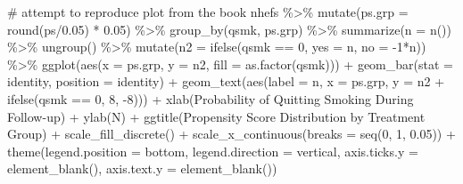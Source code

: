 \documentclass[
  10pt,
  a4paper,
]{book}
\newenvironment{Shaded}{\begin{snugshade}}{\end{snugshade}}
\newcommand{\AttributeTok}[1]{\textcolor[rgb]{0.40,0.45,0.13}{#1}}
\newcommand{\CommentTok}[1]{\textcolor[rgb]{0.37,0.37,0.37}{#1}}
\newcommand{\DecValTok}[1]{\textcolor[rgb]{0.68,0.00,0.00}{#1}}
\newcommand{\FloatTok}[1]{\textcolor[rgb]{0.68,0.00,0.00}{#1}}
\newcommand{\FunctionTok}[1]{\textcolor[rgb]{0.28,0.35,0.67}{#1}}
\newcommand{\NormalTok}[1]{\textcolor[rgb]{0.00,0.46,0.62}{#1}}
\newcommand{\SpecialCharTok}[1]{\textcolor[rgb]{0.37,0.37,0.37}{#1}}
\newcommand{\StringTok}[1]{\textcolor[rgb]{0.13,0.47,0.30}{#1}}
\begin{document}
\begin{Shaded}
\begin{Highlighting}[]
\CommentTok{\# attempt to reproduce plot from the book}
\NormalTok{nhefs }\SpecialCharTok{\%\textgreater{}\%}
  \FunctionTok{mutate}\NormalTok{(}\AttributeTok{ps.grp =} \FunctionTok{round}\NormalTok{(ps}\SpecialCharTok{/}\FloatTok{0.05}\NormalTok{) }\SpecialCharTok{*} \FloatTok{0.05}\NormalTok{) }\SpecialCharTok{\%\textgreater{}\%}
  \FunctionTok{group\_by}\NormalTok{(qsmk, ps.grp) }\SpecialCharTok{\%\textgreater{}\%}
  \FunctionTok{summarize}\NormalTok{(}\AttributeTok{n =} \FunctionTok{n}\NormalTok{()) }\SpecialCharTok{\%\textgreater{}\%}
  \FunctionTok{ungroup}\NormalTok{() }\SpecialCharTok{\%\textgreater{}\%}
  \FunctionTok{mutate}\NormalTok{(}\AttributeTok{n2 =} \FunctionTok{ifelse}\NormalTok{(qsmk }\SpecialCharTok{==} \DecValTok{0}\NormalTok{, }\AttributeTok{yes =}\NormalTok{ n, }\AttributeTok{no =}  \SpecialCharTok{{-}}\DecValTok{1}\SpecialCharTok{*}\NormalTok{n)) }\SpecialCharTok{\%\textgreater{}\%}
  \FunctionTok{ggplot}\NormalTok{(}\FunctionTok{aes}\NormalTok{(}\AttributeTok{x =}\NormalTok{ ps.grp, }\AttributeTok{y =}\NormalTok{ n2, }\AttributeTok{fill =} \FunctionTok{as.factor}\NormalTok{(qsmk))) }\SpecialCharTok{+}
  \FunctionTok{geom\_bar}\NormalTok{(}\AttributeTok{stat =} \StringTok{\textquotesingle{}identity\textquotesingle{}}\NormalTok{, }\AttributeTok{position =} \StringTok{\textquotesingle{}identity\textquotesingle{}}\NormalTok{) }\SpecialCharTok{+}
  \FunctionTok{geom\_text}\NormalTok{(}\FunctionTok{aes}\NormalTok{(}\AttributeTok{label =}\NormalTok{ n, }\AttributeTok{x =}\NormalTok{ ps.grp, }\AttributeTok{y =}\NormalTok{ n2 }\SpecialCharTok{+} \FunctionTok{ifelse}\NormalTok{(qsmk }\SpecialCharTok{==} \DecValTok{0}\NormalTok{, }\DecValTok{8}\NormalTok{, }\SpecialCharTok{{-}}\DecValTok{8}\NormalTok{))) }\SpecialCharTok{+}
  \FunctionTok{xlab}\NormalTok{(}\StringTok{\textquotesingle{}Probability of Quitting Smoking During Follow{-}up\textquotesingle{}}\NormalTok{) }\SpecialCharTok{+}
  \FunctionTok{ylab}\NormalTok{(}\StringTok{\textquotesingle{}N\textquotesingle{}}\NormalTok{) }\SpecialCharTok{+}
  \FunctionTok{ggtitle}\NormalTok{(}\StringTok{\textquotesingle{}Propensity Score Distribution by Treatment Group\textquotesingle{}}\NormalTok{) }\SpecialCharTok{+}
  \FunctionTok{scale\_fill\_discrete}\NormalTok{(}\StringTok{\textquotesingle{}\textquotesingle{}}\NormalTok{) }\SpecialCharTok{+}
  \FunctionTok{scale\_x\_continuous}\NormalTok{(}\AttributeTok{breaks =} \FunctionTok{seq}\NormalTok{(}\DecValTok{0}\NormalTok{, }\DecValTok{1}\NormalTok{, }\FloatTok{0.05}\NormalTok{)) }\SpecialCharTok{+}
  \FunctionTok{theme}\NormalTok{(}\AttributeTok{legend.position =} \StringTok{\textquotesingle{}bottom\textquotesingle{}}\NormalTok{, }\AttributeTok{legend.direction =} \StringTok{\textquotesingle{}vertical\textquotesingle{}}\NormalTok{,}
        \AttributeTok{axis.ticks.y =} \FunctionTok{element\_blank}\NormalTok{(),}
        \AttributeTok{axis.text.y =} \FunctionTok{element\_blank}\NormalTok{())}
\end{Highlighting}
\end{Shaded}
\end{document}
